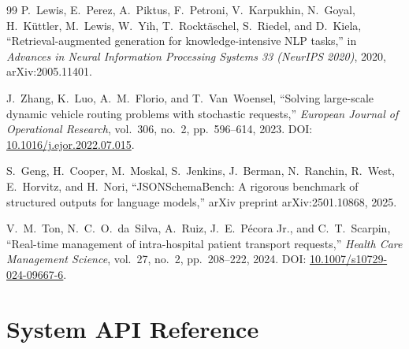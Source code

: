 \documentclass[12pt,a4paper]{article}
\begin{document}
\begin{thebibliography}{99}
P.~Lewis, E.~Perez, A.~Piktus, F.~Petroni, V.~Karpukhin, N.~Goyal, H.~K\"{u}ttler, M.~Lewis, W.~Yih, T.~Rockt\"{a}schel, S.~Riedel, and D.~Kiela,
``Retrieval-augmented generation for knowledge-intensive NLP tasks,''
in \textit{Advances in Neural Information Processing Systems 33 (NeurIPS 2020)},
2020, arXiv:2005.11401.

J.~Zhang, K.~Luo, A.~M.~Florio, and T.~Van~Woensel,
``Solving large-scale dynamic vehicle routing problems with stochastic requests,''
\textit{European Journal of Operational Research},
vol.~306, no.~2, pp.~596--614, 2023.
DOI: \href{https://doi.org/10.1016/j.ejor.2022.07.015}{10.1016/j.ejor.2022.07.015}.

S.~Geng, H.~Cooper, M.~Moskal, S.~Jenkins, J.~Berman, N.~Ranchin, R.~West, E.~Horvitz, and H.~Nori,
``JSONSchemaBench: A rigorous benchmark of structured outputs for language models,''
arXiv preprint arXiv:2501.10868, 2025.

V.~M.~Ton, N.~C.~O.~da~Silva, A.~Ruiz, J.~E.~P\'ecora Jr., and C.~T.~Scarpin,
``Real-time management of intra-hospital patient transport requests,''
\textit{Health Care Management Science},
vol.~27, no.~2, pp.~208--222, 2024.
DOI: \href{https://doi.org/10.1007/s10729-024-09667-6}{10.1007/s10729-024-09667-6}.

\end{thebibliography}

\newpage
\appendix
\section{System API Reference}
\end{document}
